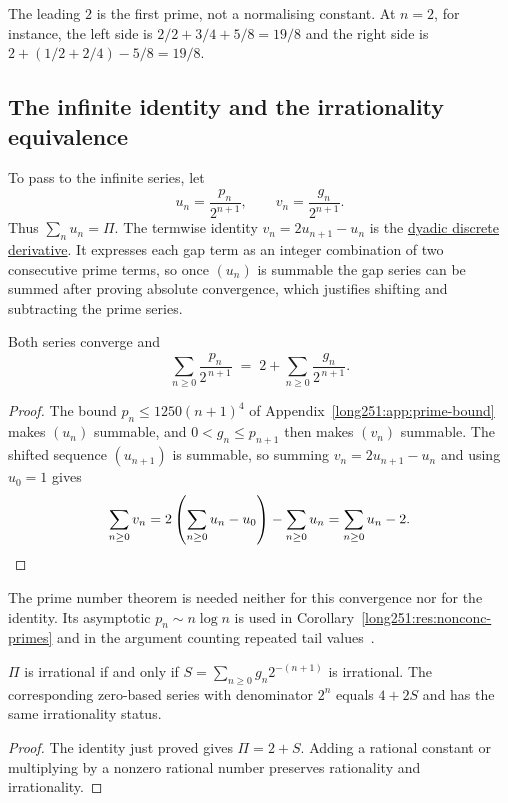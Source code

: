 The leading $2$ is the first prime, not a normalising constant.
At $n=2$, for instance, the left side is $2/2+3/4+5/8=19/8$ and the right side
is $2+(1/2+2/4)-5/8=19/8$.

\subsection{The infinite identity and the irrationality equivalence}\label{long251:sec:infinite}

To pass to the infinite series, let
\[
 u_n=\frac{p_n}{2^{n+1}},\qquad v_n=\frac{g_n}{2^{n+1}}.
\]
Thus $\sum_nu_n=\Pi$.  The termwise identity $v_n=2u_{n+1}-u_n$ is the
\href{https://github.com/wcook04/plectis-erdos/blob/3d6d938d696fed0fb71dd55115a18a73738ff223/lean/ErdosProblems/Erdos251/PrimeGapDyadicTail.lean\#L202}{dyadic
discrete derivative}.  It expresses each gap term as an integer combination of
two consecutive prime terms, so once $(u_n)$ is summable the gap series can be
summed after proving absolute convergence, which justifies shifting
and subtracting the prime series.

\begin{theorem}\label{long251:res:infinite}
Both series converge and
\[
 \sum_{n\ge0}\frac{p_n}{2^{\,n+1}}
 \;=\;2+\sum_{n\ge0}\frac{g_n}{2^{\,n+1}} .
\]
\end{theorem}

\begin{proof}
The bound $p_n\le1250(n+1)^4$ of Appendix~\ref{long251:app:prime-bound} makes $(u_n)$
summable, and $0<g_n\le p_{n+1}$ then makes $(v_n)$ summable.  The shifted
sequence $(u_{n+1})$ is summable, so summing $v_n=2u_{n+1}-u_n$ and using
$u_0=1$ gives
\[
 \sum_{n\ge0}v_n
 =2\left(\sum_{n\ge0}u_n-u_0\right)-\sum_{n\ge0}u_n
 =\sum_{n\ge0}u_n-2 . \qedhere
\]
\end{proof}

The prime number theorem is needed neither for this convergence nor for
the identity.  Its asymptotic $p_n\sim n\log n$ is used in
Corollary~\ref{long251:res:nonconc-primes} and in the argument counting
repeated tail values~\cite[Chapter~6]{mv2007}.

\begin{corollary}\label{long251:res:irr-equivalence}\label{res:irr-equivalence}
$\Pi$ is irrational if and only if $S=\sum_{n\ge0}g_n2^{-(n+1)}$ is irrational.
The corresponding zero-based series with denominator $2^n$ equals $4+2S$ and
has the same irrationality status.
\end{corollary}
\begin{proof}
The identity just proved gives $\Pi=2+S$.  Adding a rational constant or
multiplying by a nonzero rational number preserves rationality and
irrationality.
\end{proof}

